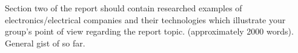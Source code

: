 

Section two of the report should contain researched examples of electronics/electrical companies and their technologies which illustrate your group’s point of view regarding the report topic.   (approximately 2000 words).
General gist of so far.



%
%
%
%
%
%
%



